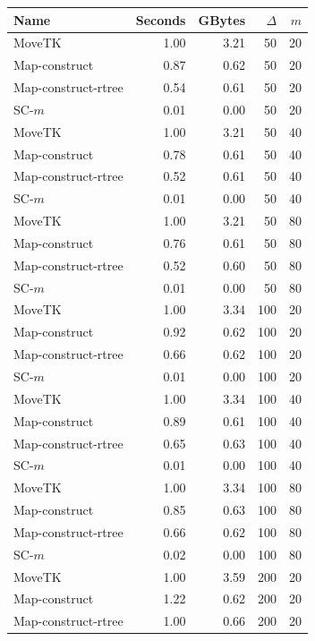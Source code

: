 \documentclass[11pt]{article}
\begin{document}
    \begin{figure} \begin{center}
    \begin{minipage}{0.5\textwidth}
    \begin{tabular}{@{}lrrrr@{}}        
        \toprule
        Name & Seconds & GBytes & $\Delta$ & $m$\\
        \midrule
        MoveTK & 1.00 & 3.21 & 50 & 20\\
Map-construct & 0.87 & 0.62 & 50 & 20\\
Map-construct-rtree & 0.54 & 0.61 & 50 & 20\\
        \medskip
SC-$m$ & 0.01 & 0.00 & 50 & 20\\
        MoveTK & 1.00 & 3.21 & 50 & 40\\
Map-construct & 0.78 & 0.61 & 50 & 40\\
Map-construct-rtree & 0.52 & 0.61 & 50 & 40\\
        \medskip
SC-$m$ & 0.01 & 0.00 & 50 & 40\\
        MoveTK & 1.00 & 3.21 & 50 & 80\\
Map-construct & 0.76 & 0.61 & 50 & 80\\
Map-construct-rtree & 0.52 & 0.60 & 50 & 80\\
        \medskip
SC-$m$ & 0.01 & 0.00 & 50 & 80\\
        MoveTK & 1.00 & 3.34 & 100 & 20\\
Map-construct & 0.92 & 0.62 & 100 & 20\\
Map-construct-rtree & 0.66 & 0.62 & 100 & 20\\
        \medskip
SC-$m$ & 0.01 & 0.00 & 100 & 20\\
        MoveTK & 1.00 & 3.34 & 100 & 40\\
Map-construct & 0.89 & 0.61 & 100 & 40\\
Map-construct-rtree & 0.65 & 0.63 & 100 & 40\\
        \medskip
SC-$m$ & 0.01 & 0.00 & 100 & 40\\
        MoveTK & 1.00 & 3.34 & 100 & 80\\
Map-construct & 0.85 & 0.63 & 100 & 80\\
Map-construct-rtree & 0.66 & 0.62 & 100 & 80\\
        \medskip
SC-$m$ & 0.02 & 0.00 & 100 & 80\\
        MoveTK & 1.00 & 3.59 & 200 & 20\\
Map-construct & 1.22 & 0.62 & 200 & 20\\
Map-construct-rtree & 1.00 & 0.66 & 200 & 20\\

\end{tabular}
\end{minipage}
\end{center}
\end{figure}
\end{document}
